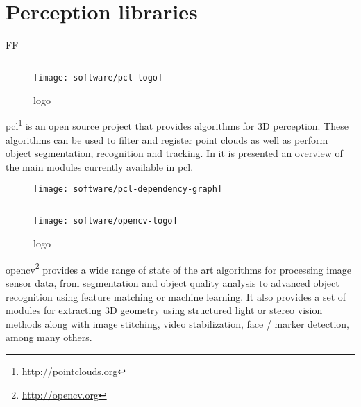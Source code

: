 \section{Perception libraries}

FF

\subsection{}

\begin{wrapfigure}{r}{0.23\textwidth}
	\centering
	\vspace*{-2em}
	\texttt{[image: software/pcl-logo]}
	\caption{ logo}
	\label{pcl-logo}
\end{wrapfigure}

\gls{pcl}\footnote{\url{http://pointclouds.org}} \cite{Rusu2011} is an open source project that provides algorithms for 3D perception. These algorithms can be used to filter and register point clouds as well as perform object segmentation, recognition and tracking. In  it is presented an overview of the main modules currently available in \gls{pcl}.

\begin{figure}[H]
	\centering
	\texttt{[image: software/pcl-dependency-graph]}
	\caption[]{\protect\footnotemark}
	\label{fig:pcl-dependency-graph}
\end{figure}


\subsection{}

\begin{wrapfigure}{r}{0.23\textwidth}
	\centering
	\vspace*{-2em}
	\texttt{[image: software/opencv-logo]}
	\caption{ logo}
	\label{fig:opencv-logo}
\end{wrapfigure}

\gls{opencv}\footnote{\url{http://opencv.org}} provides a wide range of state of the art algorithms for processing image sensor data, from segmentation and object quality analysis to advanced object recognition using feature matching or machine learning. It also provides a set of modules for extracting 3D geometry using structured light or stereo vision methods along with image stitching, video stabilization, face / marker detection, among many others.



